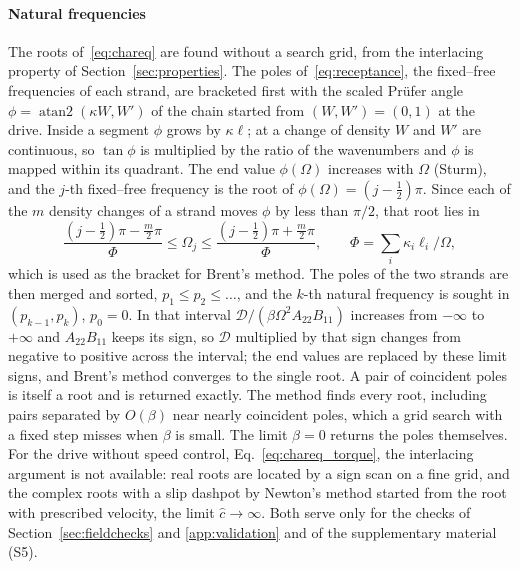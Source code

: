 \paragraph{Natural frequencies} The roots of~\eqref{eq:chareq} are found without a
search grid, from the interlacing property of Section~\ref{sec:properties}. The poles
of~\eqref{eq:receptance}, the fixed--free frequencies of each strand, are bracketed
first with the scaled Pr\"ufer angle $\phi=\operatorname{atan2}(\kappa W,W')$ of the
chain started from $(W,W')=(0,1)$ at the drive. Inside a segment $\phi$ grows by
$\kappa\ell$; at a change of density $W$ and $W'$ are continuous, so $\tan\phi$ is
multiplied by the ratio of the wavenumbers and $\phi$ is mapped within its quadrant.
The end value $\phi(\Omega)$ increases with $\Omega$ (Sturm), and the $j$-th
fixed--free frequency is the root of $\phi(\Omega)=(j-\tfrac12)\pi$. Since each of the
$m$ density changes of a strand moves $\phi$ by less than $\pi/2$, that root lies in
\begin{equation}\label{eq:prufer_bracket}
  \frac{(j-\tfrac12)\pi-\tfrac{m}{2}\pi}{\Phi}\le\Omega_j\le\frac{(j-\tfrac12)\pi+\tfrac{m}{2}\pi}{\Phi},
  \qquad \Phi=\sum_i\kappa_i\ell_i/\Omega,
\end{equation}
which is used as the bracket for Brent's method. The poles of the two strands are then
merged and sorted, $p_1\le p_2\le\dots$, and the $k$-th natural frequency is sought in
$(p_{k-1},p_k)$, $p_0=0$. In that interval $\mathcal D/(\beta\Omega^2A_{22}B_{11})$ increases
from $-\infty$ to $+\infty$ and $A_{22}B_{11}$ keeps its sign, so $\mathcal D$ multiplied by that
sign changes from negative to positive across the interval; the end values are replaced
by these limit signs, and Brent's method converges to the single root. A pair of
coincident poles is itself a root and is returned exactly. The method finds every
root, including pairs separated by $O(\beta)$ near nearly coincident poles, which a grid
search with a fixed step misses when $\beta$ is small. The limit $\beta=0$ returns the
poles themselves. For the drive without speed control, Eq.~\eqref{eq:chareq_torque},
the interlacing argument is not available: real roots are located by a sign scan on a
fine grid, and the complex roots with a slip dashpot by Newton's method started from
the root with prescribed velocity, the limit $\hat c\to\infty$. Both serve only for the
checks of Section~\ref{sec:fieldchecks} and \cref{app:validation} and of the supplementary
material (S5).

